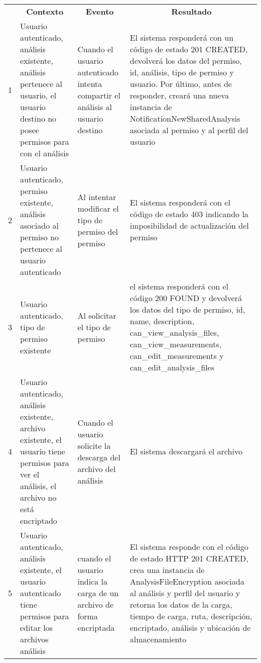 \begin{center}
\begin{longtable}{|p{0.5cm}|p{4cm}|p{4cm}|p{4.5cm}| }

	\hline 
		\rowcolor[gray]{0.9} 
		\multicolumn{4}{|c|}{\textbf{Criterio de aceptación}} \\
	\hline
    	\rowcolor[gray]{0.9} 
    	\multicolumn{1}{|c}{\textbf{Id}} & \multicolumn{1}{|c}{\textbf{Contexto}} &  \multicolumn{1}{|c}{\textbf{Evento}} & \multicolumn{1}{|c|}{\textbf{Resultado}} \\
    \hline
    	
1&Usuario autenticado, análisis existente, análisis pertenece al usuario, el usuario destino no posee permisos para con el análisis & Cuando el usuario autenticado intenta compartir el análisis al usuario destino & El sistema responderá con un código de estado 201 CREATED, devolverá los datos del permiso, id, análisis, tipo de permiso y usuario. Por último, antes de responder, creará una nueva instancia de NotificationNewSharedAnalysis asociada al permiso y al perfil del usuario\\  \hline
 
2& Usuario autenticado, permiso existente, análisis asociado al permiso no pertenece al usuario autenticado   & Al intentar modificar el tipo de permiso del permiso & El sistema responderá con el código de estado 403 indicando la imposibilidad de actualización del permiso\\ \hline

3& Usuario autenticado, tipo de permiso existente & Al solicitar el tipo de permiso & el sistema responderá con el código 200 FOUND y devolverá los datos del tipo de permiso, id, name, description, can\_view\_analysis\_files, can\_view\_measurements, can\_edit\_measurements y can\_edit\_analysis\_files\\ \hline

4& Usuario autenticado, análisis existente, archivo existente, el usuario tiene permisos para ver el análisis, el archivo no está encriptado & Cuando el usuario solicite la descarga del archivo del análisis & El sistema descargará el archivo\\ \hline

5& Usuario autenticado, análisis existente, el usuario autenticado tiene permisos para editar los archivos análisis & cuando el usuario indica la carga de un archivo de forma encriptada & El sistema responde con el código de estado HTTP 201 CREATED, crea una instancia de AnalysisFileEncryption asociada al análisis y perfil del usuario y retorna los datos de la carga, tiempo de carga, ruta, descripción, encriptado, análisis y ubicación de almacenamiento\\ \hline


\end{longtable}
\end{center}
